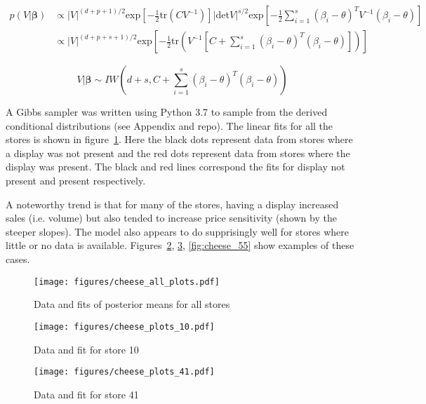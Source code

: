 \documentclass[12pt]{article}
\begin{document}
    \begin{align*}
        p(V|\mathbf{\beta}) &\propto |V|^{(d+p+1)/2} \text{exp}\left[-\frac{1}{2} \text{tr}(C V^{-1}) \right] | \text{det} V |^{s/2} \text{exp}\left[-\frac{1}{2} \sum_{i=1}^s (\beta_i - \theta)^T V^{-1} (\beta_i - \theta) \right] \\
        &\propto |V|^{(d+p+s+1)/2} \text{exp}\left[-\frac{1}{2} \text{tr}\left(V^{-1}\left[C + \sum_{i=1}^s(\beta_i - \theta)^T (\beta_i - \theta) \right]\right) \right]
    \end{align*}

    $$V|\mathbf{\beta} \sim IW\left( d+ s, C + \sum_{i=1}^s(\beta_i - \theta)^T (\beta_i - \theta) \right)$$

    A Gibbs sampler was written using Python 3.7 to sample from the derived conditional distributions (see Appendix and repo). The linear fits for all the stores is shown in figure~\ref{fig:all_cheese}. Here the black dots represent data from stores where a display was not present and the red dots represent data from stores where the display was present. The black and red lines correspond the fits for display not present and present respectively. 


    A noteworthy trend is that for many of the stores, having a display increased sales (i.e. volume) but also tended to increase price sensitivity (shown by the steeper slopes). The model also appears to do supprisingly well for stores where little or no data is available. Figures~\ref{fig:cheese_10}, \ref{fig:cheese_41}, \ref{fig:cheese_55} show examples of these cases.

    \begin{figure}[ht] 
      \centering 
      \texttt{[image: figures/cheese\_all\_plots.pdf]}
      \vskip-10pt
      \caption{\label{fig:all_cheese}Data and fits of posterior means for all stores}
    \end{figure}

    \begin{figure}[ht] 
      \centering 
      \texttt{[image: figures/cheese\_plots\_10.pdf]}
      \vskip-10pt
      \caption{\label{fig:cheese_10} Data and fit for store 10}
    \end{figure}

    \begin{figure}[ht] 
      \centering 
      \texttt{[image: figures/cheese\_plots\_41.pdf]}
      \vskip-10pt
      \caption{\label{fig:cheese_41} Data and fit for store 41}
    \end{figure}
\end{document}
